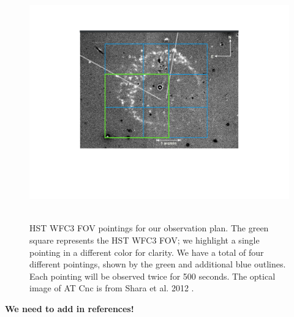 \documentclass[11pt,a4paper]{article}  %
\begin{document}
\begin{figure}[h!]
\begin{center}
\mbox{
\includegraphics[width = \textwidth]{alma_proposal_template_v4/ATCnc.pdf} 
}
\caption{HST WFC3 FOV pointings for our observation plan. The green square represents the HST WFC3 FOV; we highlight a single pointing in a different color for clarity. We have a total of four different pointings, shown by the green and additional blue outlines. Each pointing will be observed twice for 500 seconds. The optical image of AT Cnc is from Shara et al. 2012 \cite{shara2012atcnc}.}
\label{fig:observationplan}
\end{center}
\end{figure}

\textbf{We need to add in references!}
\small{ }

\end{document}
